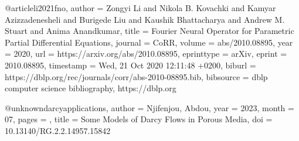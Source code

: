@article{li2021fno,
  author       = {Zongyi Li and
                  Nikola B. Kovachki and
                  Kamyar Azizzadenesheli and
                  Burigede Liu and
                  Kaushik Bhattacharya and
                  Andrew M. Stuart and
                  Anima Anandkumar},
  title        = {Fourier Neural Operator for Parametric Partial Differential Equations},
  journal      = {CoRR},
  volume       = {abs/2010.08895},
  year         = {2020},
  url          = {https://arxiv.org/abs/2010.08895},
  eprinttype   = {arXiv},
  eprint       = {2010.08895},
  timestamp    = {Wed, 21 Oct 2020 12:11:48 +0200},
  biburl       = {https://dblp.org/rec/journals/corr/abs-2010-08895.bib},
  bibsource    = {dblp computer science bibliography, https://dblp.org}
}

@unknown{darcyapplications,
author = {Njifenjou, Abdou},
year = {2023},
month = {07},
pages = {},
title = {Some Models of Darcy Flows in Porous Media},
doi = {10.13140/RG.2.2.14957.15842}
}
